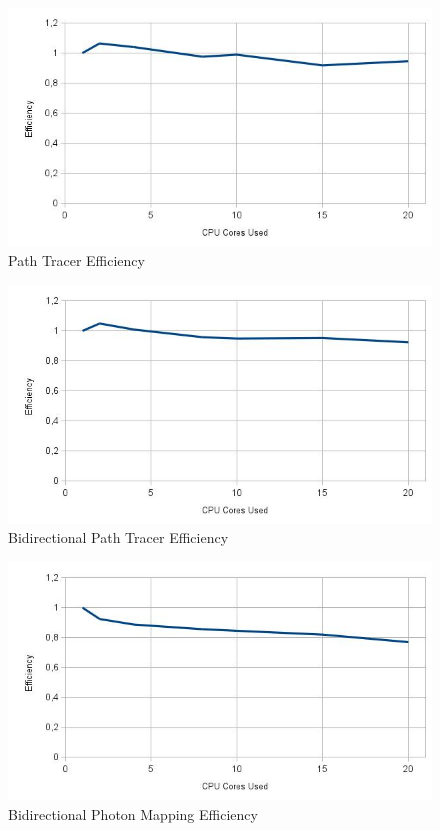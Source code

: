 \begin{figure}[H]
\includegraphics[width=\linewidth]{img/ptEff.jpg}
\caption{\label{img:ptEff} Path Tracer Efficiency}
\end{figure}

\begin{figure}[H]
\includegraphics[width=\linewidth]{img/bptEff.jpg}
\caption{\label{img:bptEff} Bidirectional Path Tracer Efficiency}
\end{figure}

\begin{figure}[H]
\includegraphics[width=\linewidth]{img/bpmEff.jpg}
\caption{\label{img:bpmEff} Bidirectional Photon Mapping Efficiency}
\end{figure}

